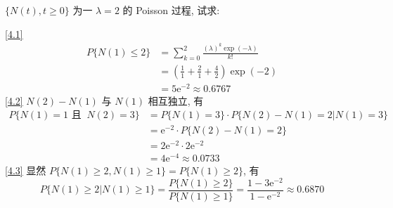 \documentclass[boxes]{homework}
\begin{document}
\begin{problem}
    $\{N(t), t\geq 0\}$ 为一 $\lambda = 2$ 的 Poisson 过程, 试求:
\end{problem}
\begin{solution}
    \ref{4.1}
    \begin{equation}
        \begin{aligned}
            P\{N(1)\leq 2\} &= \sum_{k=0}^{2} \frac{(\lambda)^k\exp(-\lambda)}{k!} \\
            &= \left(\frac{1}{1}+\frac{2}{1}+\frac{4}{2}\right)\exp(-2)\\
            &= 5\mathrm{e}^{-2}\approx 0.6767
        \end{aligned}
    \end{equation}
    \ref{4.2} $N(2)-N(1)$ 与 $N(1)$ 相互独立, 有
    \begin{equation}
        \begin{aligned}
            P\{N(1) = 1\text{ 且 }\ N(2) = 3\} &= P\{N(1) = 3\}\cdot P\{N(2) - N(1) = 2\vert N(1) = 3\}\\
            &= \mathrm{e}^{-2}\cdot P\{N(2) - N(1) = 2\}\\
            &= 2\mathrm{e}^{-2}\cdot 2\mathrm{e}^{-2}\\
            &= 4\mathrm{e}^{-4}\approx 0.0733
        \end{aligned}
    \end{equation}
    \ref{4.3} 显然 $P\{N(1)\ge 2, N(1)\ge 1\} = P\{N(1)\geq 2\}$, 有
    \begin{equation}
        P\{N(1)\geq 2\vert N(1)\geq 1\}=\frac{P\{N(1)\geq 2\}}{P\{N(1)\geq 1\}}=\frac{1-3\mathrm{e}^{-2}}{1-\mathrm{e}^{-2}}\approx 0.6870
    \end{equation}
\end{solution}
\end{document}
